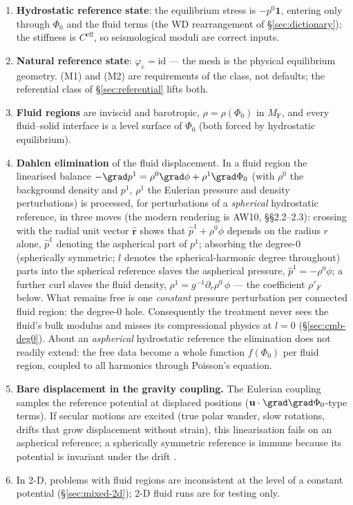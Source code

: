 \documentclass[11pt]{article}
\numberwithin{equation}{section}
\theoremstyle{remark}
\newcommand{\vu}{\mathbf{u}}
\newcommand{\MF}{M_{\mathrm{F}}}
\begin{document}
\begin{enumerate}
\item[(M1)] \textbf{Hydrostatic reference state}: the equilibrium stress
  is $-p^0\mathbf{1}$, entering only through $\Phi_0$ and the fluid terms
  (the WD rearrangement of \S\ref{sec:dictionary}); the stiffness is
  $C^{\mathrm{eff}}$, so seismological moduli are correct inputs.
\item[(M2)] \textbf{Natural reference state}: $\varphi_e = \mathrm{id}$ ---
  the mesh is the physical equilibrium geometry. (M1) and (M2) are
  requirements of the class, not defaults; the referential class of
  \S\ref{sec:referential} lifts both.
\item[(M3)] \textbf{Fluid regions} are inviscid and barotropic,
  $\rho = \rho(\Phi_0)$ in $\MF$, and every fluid--solid interface is a
  level surface of $\Phi_0$ (both forced by hydrostatic equilibrium).
\item[(M4)] \textbf{Dahlen elimination} of the fluid displacement. In a
  fluid region the linearised balance $-\grad p^1 = \rho^0\grad\phi +
  \rho^1\grad\Phi_0$ (with $\rho^0$ the background density and $p^1$,
  $\rho^1$ the Eulerian pressure and density perturbations) is processed, for perturbations of a \emph{spherical}
  hydrostatic reference, in three moves (the modern rendering is
  AW10, \S\S2.2--2.3): crossing with the radial unit vector
  $\hat{\mathbf{r}}$ shows that $\hat p^1 + \rho^0\phi$ depends on the
  radius $r$ alone, $\hat p^1$ denoting the aspherical part of $p^1$;
  absorbing the degree-0 (spherically symmetric; $l$ denotes the
  spherical-harmonic degree throughout) parts into the spherical reference slaves the aspherical pressure,
  $\hat p^1 = -\rho^0\phi$; a further curl slaves the fluid density,
  $\rho^1 = g^{-1}\partial_r\rho^0\,\phi$ --- the coefficient $\rho'_F$
  below. What remains free is one \emph{constant} pressure perturbation per
  connected fluid region: the degree-0 hole. Consequently the treatment
  never sees the fluid's bulk modulus and misses its compressional physics
  at $l=0$ (\S\ref{sec:cmb-deg0}). About an \emph{aspherical} hydrostatic
  reference the elimination does not readily extend: the free data become
  a whole function $f(\Phi_0)$ per fluid region, coupled to all harmonics
  through Poisson's equation.
\item[(M5)] \textbf{Bare displacement in the gravity coupling.} The
  Eulerian coupling samples the reference potential at displaced positions
  ($\vu\cdot\grad\grad\Phi_0$-type terms). If secular motions are excited
  (true polar wander, slow rotations, drifts that grow displacement without
  strain), this linearisation fails on an aspherical reference; a
  spherically symmetric reference is immune because its potential is
  invariant under the drift \cite{MaitraAlAttar2024}.
\item[(M6)] In 2-D, problems with fluid regions are inconsistent at the
  level of a constant potential (\S\ref{sec:mixed-2d}); 2-D fluid runs are
  for testing only.
\end{enumerate}
\end{document}
